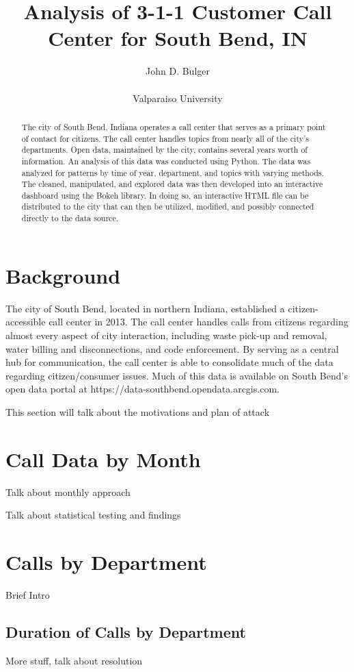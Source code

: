 \documentclass[11pt,twocolumn]{article}
\title{Analysis of 3-1-1 Customer Call Center for South Bend, IN}
\author{John D. Bulger\\
\\
Valparaiso University\\
}
\begin{document}
\maketitle
\begin{abstract}
The city of South Bend, Indiana operates a call center that serves as a primary point of contact for citizens.  The call center handles topics from nearly all of the city's departments.  Open data, maintained by the city, contains several years worth of information.  An analysis of this data was conducted using Python.  The data was 
analyzed for patterns by time of year, department, and topics with varying methods.  The cleaned, manipulated, and explored data was then developed into an 
interactive dashboard using the Bokeh library.  In doing so, an interactive HTML file can be distributed to the city that can then be utilized, modified, and possibly connected 
directly to the data source.
\end{abstract}
\section{Background}
The city of South Bend, located in northern Indiana, established a citizen-accessible call center in 2013.  %
The call center handles calls from citizens regarding almost every aspect of city interaction, including waste pick-up and removal, water billing and disconnections, 
and code enforcement.  By serving as a central hub for communication, the call center is able to consolidate much of the data regarding citizen/consumer issues.  
Much of this data is available on South Bend's open data portal at https://data-southbend.opendata.arcgis.com.
\par
This section will talk about the motivations and plan of attack

\section{Call Data by Month}
Talk about monthly approach
\par
Talk about statistical testing and findings

\section{Calls by Department}
Brief Intro
\subsection{Duration of Calls by Department}
More stuff, talk about resolution
\end{document}
